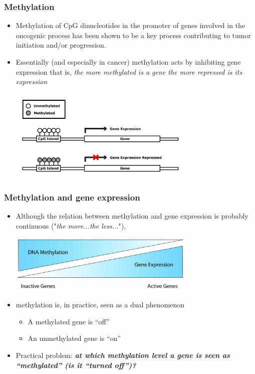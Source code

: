 \documentclass[handout]{beamer}
\begin{document}
\begin{frame}
	\frametitle{Methylation}
	\begin{itemize}
		\item Methylation of CpG dinucleotides in the promoter of genes
		involved in the oncogenic process has been shown to be a key process
		contributing to tumor initiation and/or progression.
		\item Essentially (and especially in cancer) methylation acts by inhibiting gene expression that
		is,\emph{ the more methylated is a gene the more repressed is its expression}
		\begin{center}
			\includegraphics[width=0.7\textwidth]{./images/methylationAction1.png}
		\end{center}
	\end{itemize}
\end{frame}


\begin{frame}[fragile]\frametitle{Methylation and gene expression}
	\begin{itemize}
		\item Although the relation between methylation and gene expression is probably continuous ("\emph{the more...the less...}"),
		\begin{center}
			\includegraphics[width=0.7\textwidth]{./images/DNA-Methylation-and-Gene-Expression-Relationship.jpg}
		\end{center}
		\item methylation is, in practice, seen as a dual phenomenon
		\begin{itemize}
			\item A methylated gene is ``off''
			\item An unmethylated gene is ``on''
		\end{itemize}
		\item Practical problem: \textbf{\emph{at which methylation level a gene is seen as ``methylated'' (is it ``turned off'')?}}
	\end{itemize}
	
\end{frame}
\end{document}
